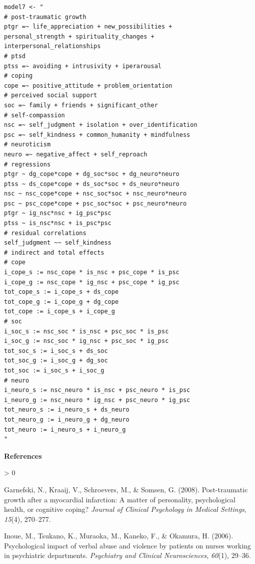 \documentclass[
  english,
  man,floatsintext]{apa7}
\newlength{\cslhangindent}
\newenvironment{CSLReferences}[2] %
 {%
  \setlength{\parindent}{0pt}
  \ifodd #1 \everypar{\setlength{\hangindent}{\cslhangindent}}\ignorespaces\fi
  \ifnum #2 > 0
  \setlength{\parskip}{#2\baselineskip}
  \fi
 }%
 {}
\begin{document}
\begin{appendix}
\begin{verbatim}
model7 <- "
# post-traumatic growth
ptgr =~ life_appreciation + new_possibilities + 
personal_strength + spirituality_changes + 
interpersonal_relationships
# ptsd
ptss =~ avoiding + intrusivity + iperarousal
# coping
cope =~ positive_attitude + problem_orientation 
# perceived social support
soc =~ family + friends + significant_other
# self-compassion
nsc =~ self_judgment + isolation + over_identification
psc =~ self_kindness + common_humanity + mindfulness
# neuroticism
neuro =~ negative_affect + self_reproach
# regressions
ptgr ~ dg_cope*cope + dg_soc*soc + dg_neuro*neuro
ptss ~ ds_cope*cope + ds_soc*soc + ds_neuro*neuro
nsc ~ nsc_cope*cope + nsc_soc*soc + nsc_neuro*neuro
psc ~ psc_cope*cope + psc_soc*soc + psc_neuro*neuro
ptgr ~ ig_nsc*nsc + ig_psc*psc 
ptss ~ is_nsc*nsc + is_psc*psc
# residual correlations
self_judgment ~~ self_kindness
# indirect and total effects
# cope
i_cope_s := nsc_cope * is_nsc + psc_cope * is_psc
i_cope_g := nsc_cope * ig_nsc + psc_cope * ig_psc
tot_cope_s := i_cope_s + ds_cope
tot_cope_g := i_cope_g + dg_cope
tot_cope := i_cope_s + i_cope_g
# soc
i_soc_s := nsc_soc * is_nsc + psc_soc * is_psc
i_soc_g := nsc_soc * ig_nsc + psc_soc * ig_psc
tot_soc_s := i_soc_s + ds_soc
tot_soc_g := i_soc_g + dg_soc
tot_soc := i_soc_s + i_soc_g
# neuro
i_neuro_s := nsc_neuro * is_nsc + psc_neuro * is_psc
i_neuro_g := nsc_neuro * ig_nsc + psc_neuro * ig_psc
tot_neuro_s := i_neuro_s + ds_neuro
tot_neuro_g := i_neuro_g + dg_neuro
tot_neuro := i_neuro_s + i_neuro_g
"
\end{verbatim}

\newpage

\begin{center}
\textbf{References}
\end{center}
\bigskip

\hypertarget{refs}{}
\begin{CSLReferences}{1}{0}
\leavevmode\hypertarget{ref-garnefski2008post}{}%
Garnefski, N., Kraaij, V., Schroevers, M., \& Somsen, G. (2008).
Post-traumatic growth after a myocardial infarction: A matter of
personality, psychological health, or cognitive coping? \emph{Journal of
Clinical Psychology in Medical Settings}, \emph{15}(4), 270--277.

\leavevmode\hypertarget{ref-inoue2006psychological}{}%
Inoue, M., Tsukano, K., Muraoka, M., Kaneko, F., \& Okamura, H. (2006).
Psychological impact of verbal abuse and violence by patients on nurses
working in psychiatric departments. \emph{Psychiatry and Clinical
Neurosciences}, \emph{60}(1), 29--36.


\end{CSLReferences}
\end{appendix}
\end{document}
